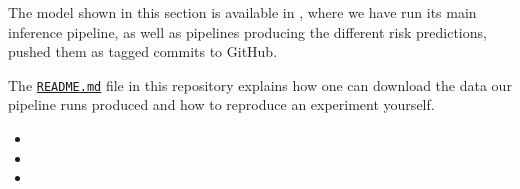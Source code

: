 \begin{tcolorbox}[
    title=\faIcon{recycle} Reproducibility,
    parbox=false,
    float
]
    The model shown in this section is available in , where we have run its main inference pipeline, as well as pipelines producing the different risk predictions, pushed them as tagged commits to GitHub.

    The \href{https://github.com/rmnldwg/lynference#readme}{ \texttt{README.md}} file in this repository explains how one can download the data our pipeline runs produced and how to reproduce an experiment yourself.

    \begin{itemize}
        \item {}
        \item {}
        \item {}
    \end{itemize}
\end{tcolorbox}
